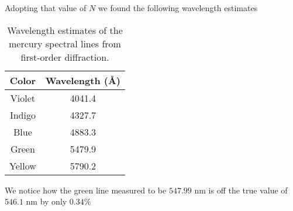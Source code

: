 \documentclass[11pt, a4paper]{article}
\begin{document}
	Adopting that value of $N$ we found the following wavelength estimates
	
	\begin{table}[h]
		\centering
		\begin{tabular}{|c|c|}
			\hline
			Color & Wavelength (\AA)\\
			\hline
			Violet & 4041.4 \\
			Indigo & 4327.7\\
			Blue & 4883.3\\
			Green & 5479.9\\
			Yellow & 5790.2\\
			\hline
		\end{tabular}
		\caption{Wavelength estimates of the mercury spectral lines from first-order diffraction.}
	\end{table}
	
	We notice how the green line measured to be $547.99$ nm is off the true value of $546.1$ nm by only $0.34\%$ 
\end{document}
